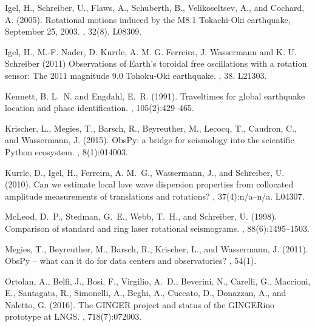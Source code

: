 \documentclass[12pt,reqno,letter]{article}
\begin{document}
\begin{thebibliography}{}
Igel, H., Schreiber, U., Flaws, A., Schuberth, B., Velikoseltsev, A., and
  Cochard, A. (2005).
\newblock Rotational motions induced by the {M}8.1 Tokachi-{O}ki earthquake,
  {S}eptember 25, 2003.
, 32(8).
\newblock L08309.

Igel, H., M.-F. Nader, D. Kurrle, A. M. G. Ferreira, J. Wassermann and K. U. Schreiber (2011)
\newblock Observations of Earth's toroidal free oscillations with a rotation sensor: The 2011 magnitude 9.0 Tohoku-Oki earthquake.
, 38.
\newblock L21303.

Kennett, B. L.~N. and Engdahl, E.~R. (1991).
\newblock Traveltimes for global earthquake location and phase identification.
, 105(2):429--465.

Krischer, L., Megies, T., Barsch, R., Beyreuther, M., Lecocq, T., Caudron, C.,
  and Wassermann, J. (2015).
\newblock Obs{P}y: a bridge for seismology into the scientific {P}ython ecosystem.
, 8(1):014003.

Kurrle, D., Igel, H., Ferreira, A. M.~G., Wassermann, J., and Schreiber, U.
  (2010).
\newblock Can we estimate local love wave dispersion properties from collocated
  amplitude measurements of translations and rotations?
, 37(4):n/a--n/a.
\newblock L04307.

McLeod, D.~P., Stedman, G.~E., Webb, T.~H., and Schreiber, U. (1998).
\newblock Comparison of standard and ring laser rotational seismograms.
,
  88(6):1495--1503.

Megies, T., Beyreuther, M., Barsch, R., Krischer, L., and Wassermann, J.
  (2011).
\newblock Obs{P}y – what can it do for data centers and observatories?
, 54(1).

Ortolan, A., Belfi, J., Bosi, F., Virgilio, A.~D., Beverini, N., Carelli, G.,
  Maccioni, E., Santagata, R., Simonelli, A., Beghi, A., Cuccato, D., Donazzan,
  A., and Naletto, G. (2016).
\newblock The {GINGER} project and status of the {GINGER}ino prototype at {LNGS}.
, 718(7):072003.


\end{thebibliography}
\end{document}

